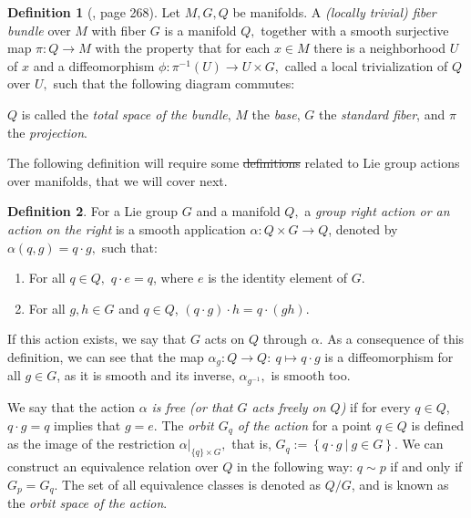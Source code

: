 \documentclass[12pt, letterpaper, reqno]{amsart}
\theoremstyle{definition}
\newtheorem{df}{Definition}
\theoremstyle{plain}
\theoremstyle{remark}
\providecommand{\DIFadd}[1]{{\protect\color{blue}\uwave{#1}}} %
\providecommand{\DIFdel}[1]{{\protect\color{red}\sout{#1}}}                      %
\providecommand{\DIFaddbegin}{} %
\providecommand{\DIFaddend}{} %
\providecommand{\DIFdelbegin}{} %
\providecommand{\DIFdelend}{} %
\newcommand{\DIFscaledelfig}{0.5}
\newlength{\DIFdelgraphicswidth} %
\newlength{\DIFdelgraphicsheight} %
\newcommand{\DIFaddincludegraphics}[2][]{{\color{blue}\fbox{\DIFOincludegraphics[#1]{#2}}}} %
\newcommand{\DIFdelincludegraphics}[2][]{%
\sbox{\DIFdelgraphicsbox}{\DIFOincludegraphics[#1]{#2}}%
\settoboxwidth{\DIFdelgraphicswidth}{\DIFdelgraphicsbox} %
\settoboxtotalheight{\DIFdelgraphicsheight}{\DIFdelgraphicsbox} %
\scalebox{\DIFscaledelfig}{%
\parbox[b]{\DIFdelgraphicswidth}{\usebox{\DIFdelgraphicsbox}\\[-\baselineskip] \rule{\DIFdelgraphicswidth}{0em}}\llap{\resizebox{\DIFdelgraphicswidth}{\DIFdelgraphicsheight}{%
\setlength{\unitlength}{\DIFdelgraphicswidth}%
\begin{picture}(1,1)%
\thicklines\linethickness{2pt} %
{\color[rgb]{1,0,0}\put(0,0){\framebox(1,1){}}}%
{\color[rgb]{1,0,0}\put(0,0){\line( 1,1){1}}}%
{\color[rgb]{1,0,0}\put(0,1){\line(1,-1){1}}}%
\end{picture}%
}\hspace*{3pt}}} %
} %
\DeclareRobustCommand{\DIFaddbegin}{\DIFOaddbegin \let\includegraphics\DIFaddincludegraphics} %
\DeclareRobustCommand{\DIFaddend}{\DIFOaddend \let\includegraphics\DIFOincludegraphics} %
\DeclareRobustCommand{\DIFdelbegin}{\DIFOdelbegin \let\includegraphics\DIFdelincludegraphics} %
\DeclareRobustCommand{\DIFdelend}{\DIFOaddend \let\includegraphics\DIFOincludegraphics} %
\begin{document}
\begin{df}[\cite{lee2003introduction}, page 268]
	Let $ M, G, Q $ be manifolds. A \textit{(locally trivial) fiber bundle} over $ M $ with fiber $ G $ is a manifold $ Q, $ together with a smooth surjective map $ \pi: Q \rightarrow {M}
$ with the property that for each $ x\in M $ there is a neighborhood $ U $ of $ x $ and a diffeomorphism $ \phi:\pi^{-1}(U) \rightarrow {U\times G,}
 $ called a local trivialization of $ Q $ over $ U, $ such that the following diagram commutes:
 \begin{center}
 \end{center}
 $ Q $ is called the \textit{total space of the bundle}, $ M $ the \textit{base}, $ G $ the \textit{standard fiber},  and $ \pi $ the \textit{projection}.   
\end{df}

The following definition will require some \DIFdelbegin \DIFdel{definitions }\DIFdelend \DIFaddbegin \DIFadd{concepts }\DIFaddend related to Lie group actions over manifolds, that we will cover next. 

\begin{df}
For a Lie group $ G $ and a manifold $ Q, $ a \textit{group right action or an action on the right} is a smooth application $ \alpha:  Q\times G \rightarrow Q $, denoted by $ \alpha(q,g) = q \cdot g, $ such that:

\begin{enumerate}
	\item For all $ q\in Q, $ $ q\cdot e = q $, where $ e $ is the identity element of $ G. $   
	\item For all $ g,h\in G $ and $ q\in Q $, $ (q\cdot g) \cdot h =q\cdot(gh). $ 
\end{enumerate}

\end{df}
If this action exists, we say that $ G $ acts on $ Q $ through $ \alpha. $ As a consequence of this definition, we can see that the map $ \alpha_g: Q \rightarrow Q: \ q\mapsto q\cdot g$ is a diffeomorphism for all $ g\in G $, as it is smooth and its inverse, $ \alpha_{g^{-1}}, $ is smooth too.

We say that the action $ \alpha $ \textit{is free (or that $ G $ acts freely on $ Q $)} if for every $ q\in Q $, $ q\cdot g =q$   implies that $ g=e. $ The \textit{orbit $ G_q $ of the action}  for a point $ q\in Q $  is defined as the image of the restriction $\alpha|_{\{q\}\times G},$  that is, $ G_q := \left\{q\cdot g \ | \ g\in G \right\}. $ We can construct an equivalence relation over $ Q $ in the following way: $ q\sim p $ if and only if $ G_p = G_q $. The set of all equivalence classes is denoted as $ Q/G $, and is known as the \textit{orbit space of the action}.     
\end{document}
